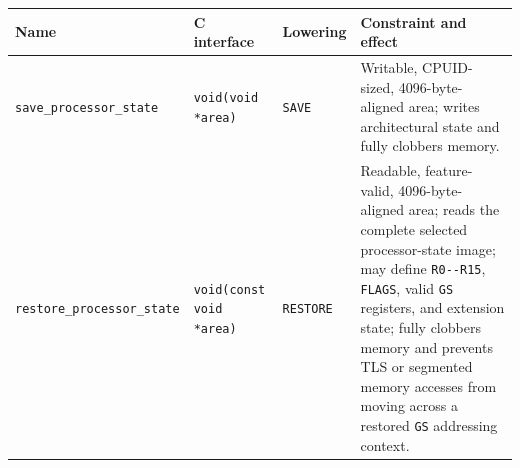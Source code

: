 \begingroup\footnotesize
\setlength{\tabcolsep}{2pt}
\begin{longtable}{@{}p{1.55in}p{1.35in}p{0.8in}p{1.9in}@{}}
\toprule
\textbf{Name} & \textbf{C interface} & \textbf{Lowering} & \textbf{Constraint and effect}\\
\midrule
\endhead
\texttt{save\_processor\_state} & \texttt{void(void *area)} & \texttt{SAVE} & Writable, CPUID-sized, 4096-byte-aligned area; writes architectural state and fully clobbers memory.\\
\texttt{restore\_processor\_state} & \texttt{void(const void *area)} & \texttt{RESTORE} & Readable, feature-valid, 4096-byte-aligned area; reads the complete selected processor-state image; may define \texttt{R0{-}{-}R15}, \texttt{FLAGS}, valid \texttt{GS} registers, and extension state; fully clobbers memory and prevents TLS or segmented memory accesses from moving across a restored \texttt{GS} addressing context.\\
\bottomrule
\end{longtable}
\endgroup
